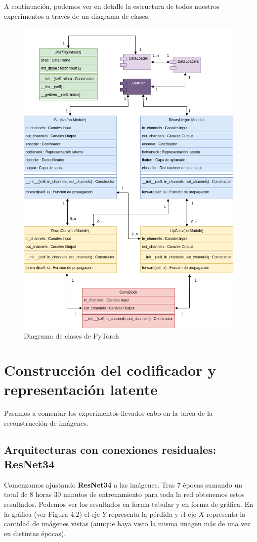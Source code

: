 A continuación, podemos ver en detalle la estructura de todos nuestros experimentos a través de un diagrama de clases.

\begin{figure}[H]
	\centering
	\includegraphics[width=0.75\linewidth]{imagenes/clases_pytorch.png}
	\caption{Diagrama de clases de PyTorch}
\end{figure}

\section{Construcción del codificador y representación latente}

Pasamos a comentar los experimentos llevados cabo en la tarea de la reconstrucción de imágenes.

\subsection{Arquitecturas con conexiones residuales: ResNet34}

Comenzamos ajustando \textbf{ResNet34} a las imágenes. Tras $7$ épocas sumando un total de $8$ horas $30$ minutos de entrenamiento para toda la red obtenemos estos resultados.
Podemos ver los resultados en forma tabular y en forma de gráfica. En la gráfica (ver Figura 4.2) el eje $Y$ representa la pérdida y el eje $X$ representa la cantidad de imágenes vistas (aunque haya visto la misma imagen más de una vez en distintas épocas). 

